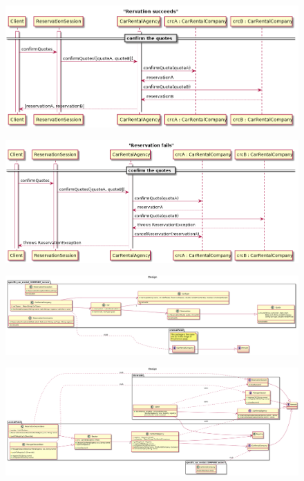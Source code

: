 \documentclass{ds-report}
\begin{document}
\clearpage
	\begin{landscape}
		\begin{figure}
			\label{reservationSucceeds}
			\centering
			\includegraphics[width=\paperwidth]{../diagrams/sequenceDiagrams/reservationSucceeds.png}
		\end{figure}
	\end{landscape}
\clearpage
	\begin{landscape}
		\begin{figure}
			\label{reservationFails}
			\centering
			\includegraphics[width=\paperwidth]{../diagrams/sequenceDiagrams/reservationFails.png}
		\end{figure}
	\end{landscape}
\clearpage
\begin{landscape}
	\begin{figure}
				\label{designreport1}
		\centering
		\includegraphics[width=\paperwidth]{designCRC.png}
	\end{figure}
\end{landscape}
\clearpage
\begin{landscape}
	\begin{figure}
		\label{designreport2}
		\centering
		\includegraphics[width=\paperwidth]{Design.png}
	\end{figure}
\end{landscape}
\end{document}
